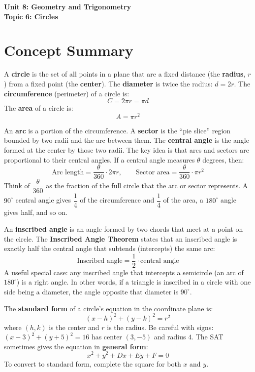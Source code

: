 \documentclass[14pt]{extarticle}
\begin{document}
\raggedright
{}

\begin{center}
    \LARGE \textbf{Unit 8: Geometry and Trigonometry} \\[6pt]
    \Large \textbf{Topic 6: Circles}
\end{center}

\vspace{1em}

\section*{Concept Summary}

A \textbf{circle} is the set of all points in a plane that are a fixed distance (the \textbf{radius}, \(r\)) from a fixed point (the \textbf{center}). The \textbf{diameter} is twice the radius: \(d = 2r\). The \textbf{circumference} (perimeter) of a circle is:
\[
C = 2\pi r = \pi d
\]
The \textbf{area} of a circle is:
\[
A = \pi r^2
\]

An \textbf{arc} is a portion of the circumference. A \textbf{sector} is the ``pie slice'' region bounded by two radii and the arc between them. The \textbf{central angle} is the angle formed at the center by those two radii. The key idea is that arcs and sectors are proportional to their central angles. If a central angle measures \(\theta\) degrees, then:
\[
\text{Arc length} = \frac{\theta}{360} \cdot 2\pi r, \qquad \text{Sector area} = \frac{\theta}{360} \cdot \pi r^2
\]
Think of \(\dfrac{\theta}{360}\) as the fraction of the full circle that the arc or sector represents. A \(90^\circ\) central angle gives \(\dfrac{1}{4}\) of the circumference and \(\dfrac{1}{4}\) of the area, a \(180^\circ\) angle gives half, and so on.

An \textbf{inscribed angle} is an angle formed by two chords that meet at a point on the circle. The \textbf{Inscribed Angle Theorem} states that an inscribed angle is exactly half the central angle that subtends (intercepts) the same arc:
\[
\text{Inscribed angle} = \frac{1}{2} \cdot \text{central angle}
\]
A useful special case: any inscribed angle that intercepts a semicircle (an arc of \(180^\circ\)) is a right angle. In other words, if a triangle is inscribed in a circle with one side being a diameter, the angle opposite that diameter is \(90^\circ\).

The \textbf{standard form} of a circle's equation in the coordinate plane is:
\[
(x - h)^2 + (y - k)^2 = r^2
\]
where \((h, k)\) is the center and \(r\) is the radius. Be careful with signs: \((x - 3)^2 + (y + 5)^2 = 16\) has center \((3, -5)\) and radius \(4\). The SAT sometimes gives the equation in \textbf{general form}:
\[
x^2 + y^2 + Dx + Ey + F = 0
\]
To convert to standard form, complete the square for both \(x\) and \(y\).
\end{document}
